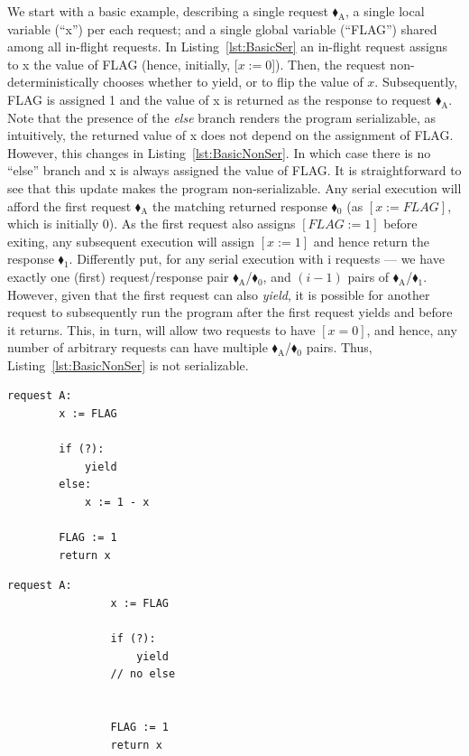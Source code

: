 We start with a basic example, describing a single request {\color{ForestGreen}$\blacklozenge_\text{A}$}, a single local variable (``x'') per each request; and a single global variable (``FLAG'') shared among all in-flight requests. 
%
In Listing~\ref{lst:BasicSer} an in-flight request assigns to x the value of FLAG (hence, initially, [$x:=0$]). Then, the request non-deterministically chooses whether to yield, or to flip the value of $x$. Subsequently, FLAG is assigned 1 and the value of x is returned as the response to request {\color{ForestGreen}$\blacklozenge_\text{A}$}. 
%
Note that the presence of the \textit{else} branch renders the program serializable, as intuitively, the returned value of x does not depend on the assignment of FLAG.
%
However, this changes in  Listing~\ref{lst:BasicNonSer}. In which case there is no ``else'' branch and x is always assigned the value of FLAG.
%
It is straightforward to see that this update makes the program non-serializable. Any serial execution will afford the first request {\color{ForestGreen}$\blacklozenge_\text{A}$} the matching returned response {\color{red}$\blacklozenge_0$} (as $[x:=FLAG]$, which is initially 0). As the first request also assigns $[FLAG:=1]$ before exiting, any subsequent execution will assign $[x:=1]$ and hence return the response {\color{red}$\blacklozenge_1$}. Differently put, for any serial execution with i requests --- we have exactly one (first) request/response pair {\color{ForestGreen}$\blacklozenge_\text{A}$}/{\color{red}$\blacklozenge_0$}, and $(i-1)$ pairs of {\color{ForestGreen}$\blacklozenge_\text{A}$}/{\color{red}$\blacklozenge_1$}.
%
However, given that the first request can also \textit{yield}, it is possible for another request to subsequently run the program after the first request yields and before it returns. This, in turn, will allow two requests to have $[x=0]$, and hence, any number of arbitrary requests can have multiple {\color{ForestGreen}$\blacklozenge_\text{A}$}/{\color{red}$\blacklozenge_0$} pairs. Thus, Listing~\ref{lst:BasicNonSer} is not serializable.





\noindent
\begin{minipage}[t]{0.45\textwidth}
	\begin{lstlisting}[caption={Serializable},
		label={lst:BasicSer}]
	request A: 
		x := FLAG
		
		if (?):
			yield
		else:
			x := 1 - x
		
		FLAG := 1
		return x
	\end{lstlisting}
\end{minipage}
\hfill
\begin{minipage}[t]{0.45\textwidth}
	\begin{lstlisting}[caption={Not serializable: {(A,0),(A,0)}},
	label={lst:BasicNonSer}]
			request A: 
			    x := FLAG 
			
			    if (?): 
			        yield
			    // no else
			
			
			    FLAG := 1 
			    return x
		\end{lstlisting}
\end{minipage}%


